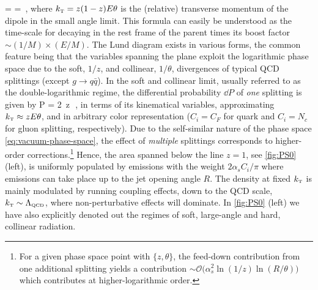 \beq
\label{eq:FormationTime}
\tform =  =  \,,
\eeq
where 
$k_{\text{\tiny T}} = z(1-z) E \theta$ is the (relative) transverse momentum of the dipole in the small angle limit. 
This formula can easily be understood as the time-scale for decaying in the rest frame of the parent times its boost factor $\sim (1/M) \times (E/M)$. 
The Lund diagram exists in various forms, the common feature being that the variables spanning the plane exploit the logarithmic phase space due to the soft, $1/z$, and collinear, $1/\theta$, divergences of typical QCD splittings (except $g \to q\bar q $).
In the soft and collinear limit, usually referred to as the double-logarithmic regime, the differential probability $\dd P$ of 
{\sl one} splitting is given by \cite{Dokshitzer:1991wu,Ellis:1991qj}
\beq
\label{eq:vacuum-phase-space}
\dd P = 2\, \dd \log z\theta \, \dd \log{} \,,
\eeq
in terms of its kinematical variables, approximating $k_{\text{\tiny T}} \approx z E \theta$, and
in arbitrary color representation ($C_i=C_F$ for quark and $C_i = N_c$ for gluon splitting, respectively). Due to the self-similar nature of the phase space \eqref{eq:vacuum-phase-space}, the effect of {\sl multiple} splittings corresponds to higher-order corrections.\footnote{For a given phase space point with $\{z,\theta\}$, the feed-down contribution from one additional splitting yields a contribution $\sim \mathcal{O}\big(\alpha_s^2 \ln (1/z) \ln (R/\theta)\big)$ which contributes at higher-logarithmic order.} Hence, the area spanned below the line $z=1$, see \autoref{fig:PS0} (left), is uniformly populated by emissions with the weight $2\alpha_s C_i/\pi$ where emissions can take place up to the jet opening angle $R$. The density at fixed $k_{\text{\tiny T}}$ is mainly modulated by running coupling effects, down to the QCD scale, $k_{\text{\tiny T}} \sim \Lambda_\text{\tiny  QCD}$, where non-perturbative effects will dominate. 
In \autoref{fig:PS0} (left) we have also explicitly denoted out the regimes of soft, large-angle  and hard, collinear radiation. 

